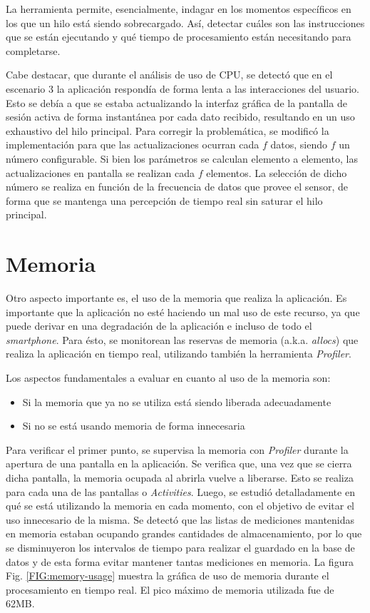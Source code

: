 La herramienta permite, esencialmente, indagar en los momentos específicos en los que un hilo está siendo sobrecargado. Así, detectar cuáles son las instrucciones que se están ejecutando y qué tiempo de procesamiento están necesitando para completarse. 

Cabe destacar, que durante el análisis de uso de CPU, se detectó que en el escenario 3 la aplicación respondía de forma lenta a las interacciones del usuario. Esto se debía a que se estaba actualizando la interfaz gráfica de la pantalla de sesión activa de forma instantánea por cada dato recibido, resultando en un uso exhaustivo del hilo principal. Para corregir la problemática, se modificó la implementación para que las actualizaciones ocurran cada $f$ datos, siendo $f$ un número configurable. Si bien los parámetros se calculan elemento a elemento, las actualizaciones en pantalla se realizan cada $f$ elementos. La selección de dicho número se realiza en función de la frecuencia de datos que provee el sensor, de forma que se mantenga una percepción de tiempo real sin saturar el hilo principal.
\newline \newline

\section*{Memoria}

Otro aspecto importante es, el uso de la memoria que realiza la aplicación. Es importante que la aplicación no esté haciendo un mal uso de este recurso, ya que puede derivar en una degradación de la aplicación e incluso de todo el \textit{smartphone}. Para ésto, se monitorean las reservas de memoria (a.k.a. \textit{allocs}) que realiza la aplicación en tiempo real, utilizando también la herramienta \textit{Profiler}. 

Los aspectos fundamentales a evaluar en cuanto al uso de la memoria son: 

\begin{itemize}
    \item Si la memoria que ya no se utiliza está siendo liberada adecuadamente
    \item Si no se está usando memoria de forma innecesaria
\end{itemize}

Para verificar el primer punto, se supervisa la memoria con \textit{Profiler} durante la apertura de una pantalla en la aplicación. Se verifica que, una vez que se cierra dicha pantalla, la memoria ocupada al abrirla vuelve a liberarse. Esto se realiza para cada una de las pantallas o \textit{Activities}. Luego, se estudió detalladamente en qué se está utilizando la memoria en cada momento, con el objetivo de evitar el uso innecesario de la misma. Se detectó que las listas de mediciones mantenidas en memoria estaban ocupando grandes cantidades de almacenamiento, por lo que se disminuyeron los intervalos de tiempo para realizar el guardado en la base de datos y de esta forma evitar mantener tantas mediciones en memoria. La figura Fig. \ref{FIG:memory-usage} muestra la gráfica de uso de memoria durante el procesamiento en tiempo real. El pico máximo de memoria utilizada fue de 62MB.

